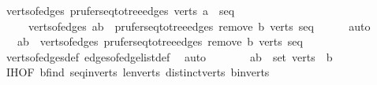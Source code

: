 \begin{isabellebody}
\ {\isachardoublequoteopen}verts{\isacharunderscore}{\kern0pt}of{\isacharunderscore}{\kern0pt}edges\ {\isacharparenleft}{\kern0pt}prufer{\isacharunderscore}{\kern0pt}seq{\isacharunderscore}{\kern0pt}to{\isacharunderscore}{\kern0pt}tree{\isacharunderscore}{\kern0pt}edges\ verts\ {\isacharparenleft}{\kern0pt}a\ {\isacharhash}{\kern0pt}\ seq{\isacharparenright}{\kern0pt}{\isacharparenright}{\kern0pt}\isanewline
\ \ \ \ {\isacharequal}{\kern0pt}\ verts{\isacharunderscore}{\kern0pt}of{\isacharunderscore}{\kern0pt}edges\ {\isacharparenleft}{\kern0pt}{\isacharparenleft}{\kern0pt}a{\isacharcomma}{\kern0pt}b{\isacharparenright}{\kern0pt}\ {\isacharhash}{\kern0pt}\ prufer{\isacharunderscore}{\kern0pt}seq{\isacharunderscore}{\kern0pt}to{\isacharunderscore}{\kern0pt}tree{\isacharunderscore}{\kern0pt}edges\ {\isacharparenleft}{\kern0pt}remove{}\ b\ verts{\isacharparenright}{\kern0pt}\ seq{\isacharparenright}{\kern0pt}{\isachardoublequoteclose}\isanewline
\ \ \ \ \isamarkupfalse%
\ auto\isanewline
\ \ \isamarkupfalse%
\ \isamarkupfalse%
\ {\isachardoublequoteopen}{\isasymdots}\ {\isacharequal}{\kern0pt}\ {\isacharbraceleft}{\kern0pt}a{\isacharcomma}{\kern0pt}b{\isacharbraceright}{\kern0pt}\ {\isasymunion}\ verts{\isacharunderscore}{\kern0pt}of{\isacharunderscore}{\kern0pt}edges\ {\isacharparenleft}{\kern0pt}prufer{\isacharunderscore}{\kern0pt}seq{\isacharunderscore}{\kern0pt}to{\isacharunderscore}{\kern0pt}tree{\isacharunderscore}{\kern0pt}edges\ {\isacharparenleft}{\kern0pt}remove{}\ b\ verts{\isacharparenright}{\kern0pt}\ seq{\isacharparenright}{\kern0pt}{\isachardoublequoteclose}\isanewline
\ \ \ \ \isamarkupfalse%
\ verts{\isacharunderscore}{\kern0pt}of{\isacharunderscore}{\kern0pt}edges{\isacharunderscore}{\kern0pt}def\ edges{\isacharunderscore}{\kern0pt}of{\isacharunderscore}{\kern0pt}edge{\isacharunderscore}{\kern0pt}list{\isacharunderscore}{\kern0pt}def\ \isamarkupfalse%
\ auto\isanewline
\ \ \isamarkupfalse%
\ \isamarkupfalse%
\ {\isachardoublequoteopen}{\isasymdots}\ {\isacharequal}{\kern0pt}\ {\isacharbraceleft}{\kern0pt}a{\isacharcomma}{\kern0pt}b{\isacharbraceright}{\kern0pt}\ {\isasymunion}\ {\isacharparenleft}{\kern0pt}set\ verts\ {\isacharminus}{\kern0pt}\ {\isacharbraceleft}{\kern0pt}b{\isacharbraceright}{\kern0pt}{\isacharparenright}{\kern0pt}{\isachardoublequoteclose}\ \isamarkupfalse%
\ {\isachardoublequoteopen}{}{\isachardot}{\kern0pt}IH{\isachardoublequoteclose}{\isacharbrackleft}{\kern0pt}OF\ b{\isacharunderscore}{\kern0pt}find\ seq{\isacharunderscore}{\kern0pt}in{\isacharunderscore}{\kern0pt}verts{\isacharprime}{\kern0pt}\ len{\isacharunderscore}{\kern0pt}verts{\isacharprime}{\kern0pt}\ distinct{\isacharunderscore}{\kern0pt}verts{\isacharprime}{\kern0pt}{\isacharbrackright}{\kern0pt}\ b{\isacharunderscore}{\kern0pt}in{\isacharunderscore}{\kern0pt}verts\ \isamarkupfalse%

\end{isabellebody}
